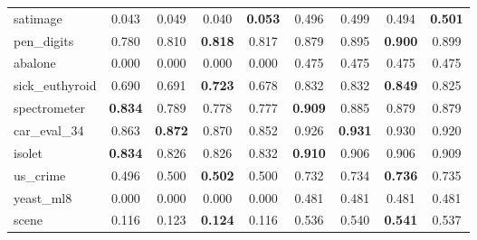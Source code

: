 \begin{figure}[ht]
\begin{tabular}{p{22mm}|*4{p{14mm}}|*4{p{14mm}}}
        satimage&\multicolumn{1}{c}{0.043}&\multicolumn{1}{c}{0.049}&\multicolumn{1}{c}{0.040}&\multicolumn{1}{c|}{\textbf{0.053}}&\multicolumn{1}{c}{0.496}&\multicolumn{1}{c}{0.499}&\multicolumn{1}{c}{0.494}&\multicolumn{1}{c}{\textbf{0.501}}\\
        pen\_digits&\multicolumn{1}{c}{0.780}&\multicolumn{1}{c}{0.810}&\multicolumn{1}{c}{\textbf{0.818}}&\multicolumn{1}{c|}{0.817}&\multicolumn{1}{c}{0.879}&\multicolumn{1}{c}{0.895}&\multicolumn{1}{c}{\textbf{0.900}}&\multicolumn{1}{c}{0.899}\\
        abalone&\multicolumn{1}{c}{0.000}&\multicolumn{1}{c}{0.000}&\multicolumn{1}{c}{0.000}&\multicolumn{1}{c|}{0.000}&\multicolumn{1}{c}{0.475}&\multicolumn{1}{c}{0.475}&\multicolumn{1}{c}{0.475}&\multicolumn{1}{c}{0.475}\\
        sick\_euthyroid&\multicolumn{1}{c}{0.690}&\multicolumn{1}{c}{0.691}&\multicolumn{1}{c}{\textbf{0.723}}&\multicolumn{1}{c|}{0.678}&\multicolumn{1}{c}{0.832}&\multicolumn{1}{c}{0.832}&\multicolumn{1}{c}{\textbf{0.849}}&\multicolumn{1}{c}{0.825}\\
        spectrometer&\multicolumn{1}{c}{\textbf{0.834}}&\multicolumn{1}{c}{0.789}&\multicolumn{1}{c}{0.778}&\multicolumn{1}{c|}{0.777}&\multicolumn{1}{c}{\textbf{0.909}}&\multicolumn{1}{c}{0.885}&\multicolumn{1}{c}{0.879}&\multicolumn{1}{c}{0.879}\\
        car\_eval\_34&\multicolumn{1}{c}{0.863}&\multicolumn{1}{c}{\textbf{0.872}}&\multicolumn{1}{c}{0.870}&\multicolumn{1}{c|}{0.852}&\multicolumn{1}{c}{0.926}&\multicolumn{1}{c}{\textbf{0.931}}&\multicolumn{1}{c}{0.930}&\multicolumn{1}{c}{0.920}\\
        isolet&\multicolumn{1}{c}{\textbf{0.834}}&\multicolumn{1}{c}{0.826}&\multicolumn{1}{c}{0.826}&\multicolumn{1}{c|}{0.832}&\multicolumn{1}{c}{\textbf{0.910}}&\multicolumn{1}{c}{0.906}&\multicolumn{1}{c}{0.906}&\multicolumn{1}{c}{0.909}\\
        us\_crime&\multicolumn{1}{c}{0.496}&\multicolumn{1}{c}{0.500}&\multicolumn{1}{c}{\textbf{0.502}}&\multicolumn{1}{c|}{0.500}&\multicolumn{1}{c}{0.732}&\multicolumn{1}{c}{0.734}&\multicolumn{1}{c}{\textbf{0.736}}&\multicolumn{1}{c}{0.735}\\
        yeast\_ml8&\multicolumn{1}{c}{0.000}&\multicolumn{1}{c}{0.000}&\multicolumn{1}{c}{0.000}&\multicolumn{1}{c|}{0.000}&\multicolumn{1}{c}{0.481}&\multicolumn{1}{c}{0.481}&\multicolumn{1}{c}{0.481}&\multicolumn{1}{c}{0.481}\\
        scene&\multicolumn{1}{c}{0.116}&\multicolumn{1}{c}{0.123}&\multicolumn{1}{c}{\textbf{0.124}}&\multicolumn{1}{c|}{0.116}&\multicolumn{1}{c}{0.536}&\multicolumn{1}{c}{0.540}&\multicolumn{1}{c}{\textbf{0.541}}&\multicolumn{1}{c}{0.537}\\

\end{tabular}
\end{figure}
